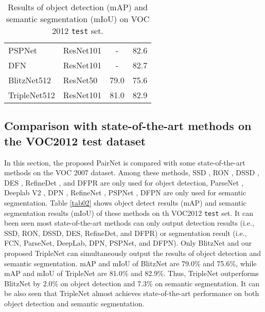 \documentclass[10pt,twocolumn,letterpaper]{article}
\begin{document}
\begin{table}[t]
\begin{center}
{\begin{tabular}{l|l|cc}
  PSPNet  \cite{Zhao_PSPNet_CVPR_2017}      & ResNet101      & -     &   82.6                \\
  DFN   \cite{Yu_DFN_CVPR_2018}       & ResNet101                     &  - & 82.7                           \\\hline  
  BlitzNet512 \cite{Dvornik_Blitznet_ICCV_2017} & ResNet50                   & 79.0  &    75.6              \\  
  TripleNet512 & ResNet101                    &  81.0 & 82.9                    \\\hline 
\end{tabular}} 
\end{center}
\caption{Results of object detection (mAP) and semantic segmentation (mIoU) on VOC 2012 \texttt{test} set.}
 \label{tabVOC2012}
\end{table}
\subsection{Comparison with state-of-the-art methods on the VOC2012 test dataset}
In this section, the proposed PairNet is compared with some state-of-the-art methods on the VOC 2007 dataset. Among these methods, SSD \cite{Liu_SSD_ECCV_2016}, RON \cite{Kong_RON_CVPR_2017}, DSSD \cite{Fu_DSSD_arXiv_2017}, DES \cite{Zhang_DES_CVPR_2018}, RefineDet \cite{Zhang_RefineDet_CVPR_2018}, and DFPR \cite{Kong_DFPR_ECCV_2018} are only used for object detection, ParseNet \cite{Liu_ParseNet_ICLR_2016}, Deeplab V2 \cite{Chen_Deeplab_PAMI_2017}, DPN \cite{Liu_DPN_ICCV_2015}, RefineNet \cite{Lin_Refinenet_CVPR_2017}, PSPNet \cite{Zhao_PSPNet_CVPR_2017}, DFPN \cite{Yu_DFN_CVPR_2018} are only used for semantic segmentation. Table \ref{tab02} shows object detect results (mAP) and semantic segmentation results (mIoU) of these methods on th VOC2012 \texttt{test} set. It can been seen most state-of-the-art methods can only output detection results (i.e., SSD, RON, DSSD, DES, RefineDet, and DFPR) or segmentation result (i.e., FCN, ParseNet, DeepLab, DPN, PSPNet, and DFPN). Only BlitzNet and our proposed TripleNet can simultaneously output the results of object detection and semantic segmentation. mAP and mIoU of BlitzNet are 79.0\% and 75.6\%, while mAP and mIoU of TripleNet are 81.0\% and 82.9\%. Thus, TripleNet outperforms BlitzNet by 2.0\% on object detection and 7.3\% on semantic segmentation. It can be also seen that TripleNet almost achieves state-of-the-art performance on both object detection and semantic segmentation.
\end{document}
